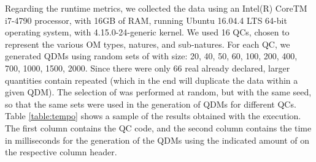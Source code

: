 
Regarding the runtime metrics, we collected the data using an Intel(R) Core{TM} i7-4790 processor, 
with 16GB of RAM, running Ubuntu 16.04.4 LTS 64-bit operating system, with 4.15.0-24-generic kernel. We used 16 QCs, 
chosen to represent the various OM types, natures, and sub-natures. For each QC, we generated QDMs using 
random sets of \callers with size: 20, 40, 50, 60, 100, 200, 400, 700, 1000, 1500, 2000. 
Since there were only 66 real \callers already declared, larger quantities contain repeated \callers (which in the end will duplicate 
the data within a given QDM). The selection of \callers was performed at random, but with the same seed, so that the same sets were used in the 
generation of QDMs for different QCs. Table \ref{table:tempo} shows a sample of the results obtained with the execution. 
The first column contains the QC code, and the second column contains the time in milliseconds for the generation of 
the QDMs using the indicated amount of \callers on the respective column header.

